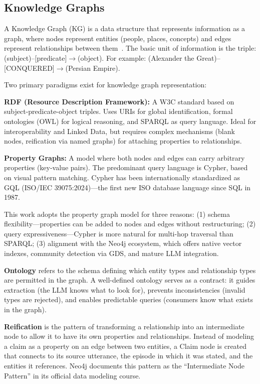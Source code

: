 \subsection{Knowledge Graphs}

A Knowledge Graph (KG) is a data structure that represents information as a graph, where nodes represent entities (people, places, concepts) and edges represent relationships between them~\cite{hogan2021knowledge}. The basic unit of information is the triple: (subject)--[predicate]$\rightarrow$(object). For example: (Alexander the Great)--[CONQUERED]$\rightarrow$(Persian Empire).

Two primary paradigms exist for knowledge graph representation:

\textbf{RDF (Resource Description Framework):} A W3C standard based on subject-predicate-object triples. Uses URIs for global identification, formal ontologies (OWL) for logical reasoning, and SPARQL as query language. Ideal for interoperability and Linked Data, but requires complex mechanisms (blank nodes, reification via named graphs) for attaching properties to relationships.

\textbf{Property Graphs:} A model where both nodes and edges can carry arbitrary properties (key-value pairs). The predominant query language is Cypher, based on visual pattern matching. Cypher has been internationally standardized as GQL (ISO/IEC 39075:2024)---the first new ISO database language since SQL in 1987.

This work adopts the property graph model for three reasons: (1) schema flexibility---properties can be added to nodes and edges without restructuring; (2) query expressiveness---Cypher is more natural for multi-hop traversal than SPARQL; (3) alignment with the Neo4j ecosystem, which offers native vector indexes, community detection via GDS, and mature LLM integration.

\textbf{Ontology} refers to the schema defining which entity types and relationship types are permitted in the graph. A well-defined ontology serves as a contract: it guides extraction (the LLM knows what to look for), prevents inconsistencies (invalid types are rejected), and enables predictable queries (consumers know what exists in the graph).

\textbf{Reification} is the pattern of transforming a relationship into an intermediate node to allow it to have its own properties and relationships. Instead of modeling a claim as a property on an edge between two entities, a Claim node is created that connects to its source utterance, the episode in which it was stated, and the entities it references. Neo4j documents this pattern as the ``Intermediate Node Pattern'' in its official data modeling course.

